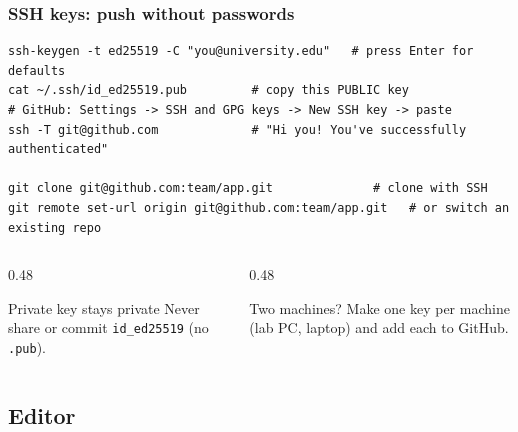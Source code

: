 \documentclass[aspectratio=169,10pt,compress]{beamer}
\begin{document}
\begin{frame}[t,fragile] \frametitle{SSH keys: push without passwords}
\begin{lstlisting}
ssh-keygen -t ed25519 -C "you@university.edu"   # press Enter for defaults
cat ~/.ssh/id_ed25519.pub         # copy this PUBLIC key
# GitHub: Settings -> SSH and GPG keys -> New SSH key -> paste
ssh -T git@github.com             # "Hi you! You've successfully authenticated"

git clone git@github.com:team/app.git              # clone with SSH
git remote set-url origin git@github.com:team/app.git   # or switch an existing repo
\end{lstlisting}

  \begin{columns}[T]
    \begin{column}{0.48\textwidth}
      \begin{alertblock}{Private key stays private}
        Never share or commit \texttt{id\_ed25519} (no \texttt{.pub}).
      \end{alertblock}
    \end{column}
    \begin{column}{0.48\textwidth}
      \begin{block}{Two machines?}
        Make one key per machine (lab PC, laptop) and add each to GitHub.
      \end{block}
    \end{column}
  \end{columns}
\end{frame}

\subsection{Editor}
\end{document}
